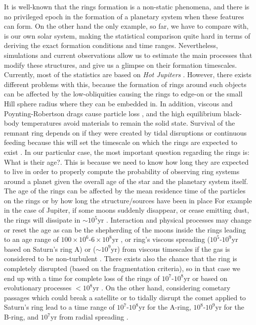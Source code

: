 It is well-known that the rings formation is a non-static phenomena, and there is no privileged epoch in the formation of a planetary system when these features can form. On the other hand the only example, so far, we have to compare with, is our own solar system, making the statistical comparison quite hard in terms of deriving the exact formation conditions and time ranges. Nevertheless, simulations and current observations allow us to estimate the main processes that modify these structures, and give us a glimpse on their formation timescales.\\

Currently, most of the statistics are based on \textit{Hot Jupiters} \citeyear{2013pss3.book..309T}. However, there exists different problems with this, because the formation of rings around such objects can be affected by the low-obliquities causing the rings to edge-on or the small Hill sphere radius where they can be embedded in. In addition, viscous and Poynting-Robertson drags cause particle loss , and the high equilibrium black-body temperatures avoid materials to remain the solid state. Survival of the remnant ring depends on if they were created by tidal disruptions or continuous feeding because this will set the timescale on which the rings are expected to exist \citeyear{1984prin.conf..641H}. In our particular case, the most important question regarding the rings is: What is their age?. This is because we need to know how long they are expected to live in order to properly compute the probability of observing ring systems around a planet given the overall age of the star and the planetary system itself. The age of the rings can be affected by the mean residence time of the particles on the rings or by how long the structure/sources have been in place For example in the case of Jupiter, if some moons suddenly disappear, or cease emitting dust, the rings will dissipate in $\sim 10^5$yr \citeyear{2013pss3.book..309T}. Interaction and physical processes may change or reset the age as can be the shepherding of the moons inside the rings leading to an age range of $100\times 10^6$-$6\times10^8$yr \citeyear{1994P&SS...42.1139C}, or ring's viscous spreading ($10^5$-$10^9$yr based on Saturn's ring A) \citeyear{2009sfch.book..537C} or ($\sim10^9$yr) from viscous timescales if the gas is considered to be non-turbulent \citeyear{1984prin.conf..641H}. There exists also the chance that the ring is completely disrupted (based on the fragmentation criteria), so in that case we end up with a time for complete loss of the rings of $10^{7}$-$10^8$yr \citeyear{1994P&SS...42.1139C} or based on evolutionary processes $< 10^8$yr \citeyear{2009sfch.book..537C}. On the other hand, considering cometary passages which could break a satellite or to tidally disrupt the comet applied to Saturn's ring lead to a time range of $10^7$-$10^8$yr for the A-ring, $10^8$-$10^9$yr for the B-ring, and $10^7$yr from radial spreading \citeyear{2009sfch.book..537C}.\\

